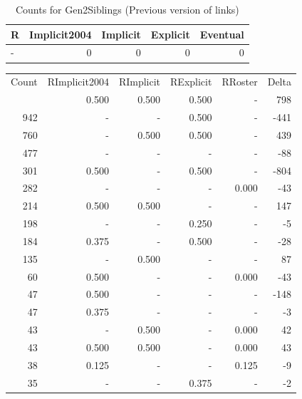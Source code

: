 \documentclass[a4paper]{article}\usepackage{graphicx, color}
\begin{document}
\begin{table}[ht]
\centering
{\large
\begin{tabular}{lrrrr}
  \hline
R & Implicit2004 & Implicit & Explicit & Eventual \\ 
  \hline
- &   0 &   0 &   0 &   0 \\ 
   \hline
\end{tabular}
}
\caption{Counts for Gen2Siblings (Previous version of links)} 
\end{table}



\begin{table}[ht]
\centering
\begin{tabular}{rrrrrr}
  \hline
Count & RImplicit2004 & RImplicit & RExplicit & RRoster & Delta \\ 
  \rowcolor{goodColor}  \hline
1172 & 0.500 & 0.500 & 0.500 & - & 798 \\ 
   \rowcolor{sosoColor} 942 & - & - & 0.500 & - & -441 \\ 
   \rowcolor{goodColor} 760 & - & 0.500 & 0.500 & - & 439 \\ 
   \rowcolor{nullColor} 477 & - & - & - & - & -88 \\ 
   \rowcolor{sosoColor} 301 & 0.500 & - & 0.500 & - & -804 \\ 
   \rowcolor{nullColor} 282 & - & - & - & 0.000 & -43 \\ 
  214 & 0.500 & 0.500 & - & - & 147 \\ 
   \rowcolor{sosoColor} 198 & - & - & 0.250 & - & -5 \\ 
   \rowcolor{sosoColor} 184 & 0.375 & - & 0.500 & - & -28 \\ 
  135 & - & 0.500 & - & - & 87 \\ 
   \rowcolor{nullColor} 60 & 0.500 & - & - & 0.000 & -43 \\ 
   \rowcolor{nullColor} 47 & 0.500 & - & - & - & -148 \\ 
   \rowcolor{nullColor} 47 & 0.375 & - & - & - & -3 \\ 
  43 & - & 0.500 & - & 0.000 & 42 \\ 
  43 & 0.500 & 0.500 & - & 0.000 & 43 \\ 
   \rowcolor{nullColor} 38 & 0.125 & - & - & 0.125 & -9 \\ 
   \rowcolor{sosoColor} 35 & - & - & 0.375 & - & -2 \\ 

\end{tabular}
\end{table}
\end{document}
